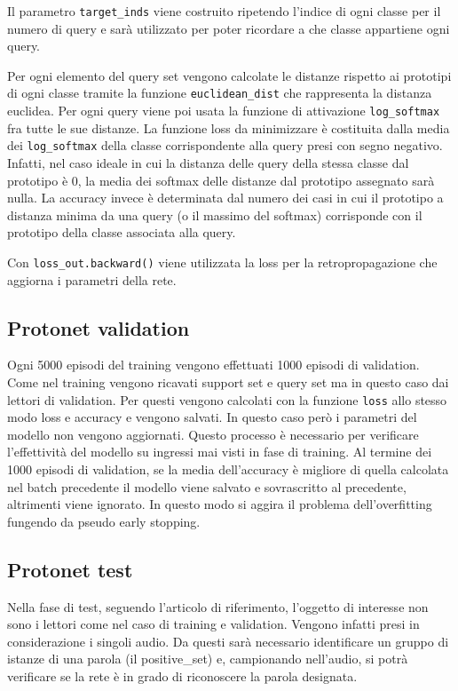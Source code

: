 \documentclass[12pt,a4paper,titlepage]{article}
\begin{document}
Il parametro \texttt{target\_inds} viene costruito ripetendo l'indice di ogni classe per il numero di query e sarà utilizzato per poter ricordare a che classe appartiene ogni query.

Per ogni elemento del query set vengono calcolate le distanze rispetto ai prototipi di ogni classe tramite la funzione \texttt{euclidean\_dist} che rappresenta la distanza euclidea.
Per ogni query viene poi usata la funzione di attivazione \texttt{log\_softmax} fra tutte le sue distanze.
La funzione loss da minimizzare è costituita dalla media dei \texttt{log\_softmax} della classe corrispondente alla query presi con segno negativo. Infatti, nel caso ideale in cui la distanza delle query della stessa classe dal prototipo è 0, la media dei softmax delle distanze dal prototipo assegnato sarà nulla.
La accuracy invece è determinata dal numero dei casi in cui il prototipo a distanza minima da una query (o il massimo del softmax) corrisponde con il prototipo della classe associata alla query.


Con \texttt{loss\_out.backward()} viene utilizzata la loss per la retropropagazione che aggiorna i parametri della rete.
\subsection{Protonet validation}
Ogni 5000 episodi del training vengono effettuati 1000 episodi di validation.
Come nel training vengono ricavati support set e query set ma in questo caso dai lettori di validation.
Per questi vengono calcolati con la funzione \texttt{loss} allo stesso modo loss e accuracy e vengono salvati.
In questo caso però i parametri del modello non vengono aggiornati.
Questo processo è necessario per verificare l'effettività del modello su ingressi mai visti in fase di training.
Al termine dei 1000 episodi di validation, se la media dell'accuracy è migliore di quella calcolata nel batch precedente il modello viene salvato e sovrascritto al precedente, altrimenti viene ignorato.
In questo modo si aggira il problema dell'overfitting fungendo da pseudo early stopping. 
\subsection{Protonet test}
Nella fase di test, seguendo l'articolo di riferimento, l'oggetto di interesse non sono i lettori come nel caso di training e validation. Vengono infatti presi in considerazione i singoli audio. Da questi sarà necessario identificare un gruppo di istanze di una parola (il positive\_set) e, campionando nell'audio, si potrà verificare se la rete è in grado di riconoscere la parola designata.
\end{document}
